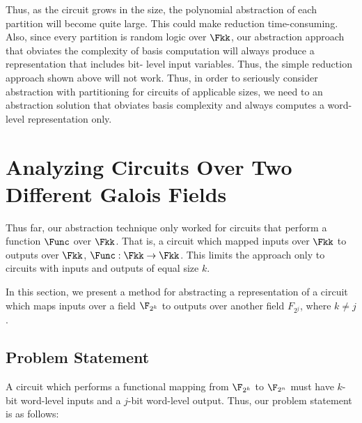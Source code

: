 Thus, as the circuit grows in the size, the polynomial abstraction of each
partition will become quite large. This could make reduction time-consuming.
Also, since every partition is random logic over $\Fkk$, our 
abstraction approach that obviates the complexity of \Grobner basis 
computation will always produce a representation that includes bit-
level input variables. Thus, the simple reduction approach shown above will
not work. Thus, in order to seriously consider abstraction with 
partitioning for circuits of applicable sizes, we need to an abstraction 
solution that obviates \Grobner basis complexity and always computes a word-
level representation only.

\section{Analyzing Circuits Over Two Different Galois Fields}

Thus far, our abstraction technique only worked for circuits that perform
a function $\Func$ over $\Fkk$. That is, a circuit which mapped inputs
over $\Fkk$ to outputs over $\Fkk$, $\Func:\Fkk\rightarrow \Fkk$. This
limits the approach only to circuits with inputs and outputs of equal size 
$k$.

In this section, we present a method for abstracting a representation of a
circuit which maps inputs over a field $\F_{2^k}$ to outputs over another
field $F_{2^j}$, where $k \neq j$. 

\subsection{Problem Statement}
A circuit which performs a functional mapping from $\F_{2^k}$ to $\F_{2^n}$
must have $k$-bit word-level inputs and a $j$-bit word-level output. 
Thus, our problem statement is as follows:

